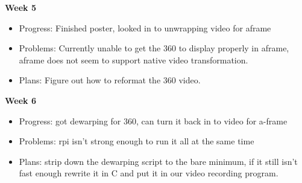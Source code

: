         \textbf{Week 5}
        \begin{itemize}
            \item Progress: Finished poster, looked in to unwrapping video for aframe

            \item Problems: Currently unable to get the 360 to display properly in aframe, aframe does not seem to support native video transformation.

            \item Plans: Figure out how to reformat the 360 video.
        \end{itemize}
        \textbf{Week 6}
        \begin{itemize}
            \item Progress: got dewarping for 360, can turn it back in to video for a-frame

            \item Problems: rpi isn't strong enough to run it all at the same time

            \item Plans: strip down the dewarping script to the bare minimum, if it still isn't fast enough rewrite it in C and put it in our video recording program.
        \end{itemize}
        